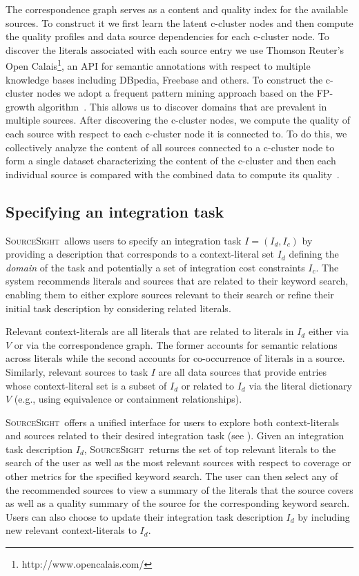 \documentclass{vldb}
\newcommand\system{\textsc{SourceSight}}
\begin{document}
The correspondence graph serves as a content and quality index for the available sources. To construct it we first learn the latent c-cluster nodes and then compute the quality profiles and data source dependencies for each c-cluster node. To discover the literals associated with each source entry we use Thomson Reuter's Open Calais\footnote{http://www.opencalais.com/}, an API for semantic annotations with respect to multiple knowledge bases including DBpedia, Freebase and others. To construct the c-cluster nodes we adopt a frequent pattern mining approach based on the FP-growth algorithm~\cite{Han:2000}. This allows us to discover domains that are prevalent in multiple sources. After discovering the c-cluster nodes, we compute the quality of each source with respect to each c-cluster node it is connected to. To do this, we collectively analyze the content of all sources connected to a c-cluster node to form a single dataset characterizing the content of the c-cluster and then each individual source is compared with the combined data to compute its quality~\cite{rekatsinas:2015}. 

\subsection{Specifying an integration task}
\label{sec:integtask}
\system~allows users to specify an integration task $I = (I_d, I_c)$ by providing a description that corresponds to a context-literal set $I_d$ defining the {\em domain} of the task and potentially a set of integration cost constraints $I_c$. The system recommends literals and sources that are related to their keyword search, enabling them to either explore sources relevant to their search or refine their initial task description by considering related literals.

Relevant context-literals are all literals that are related to literals in $I_d$ either via $V$ or via the correspondence graph. The former accounts for semantic relations across literals while the second accounts for co-occurrence of literals in a source. Similarly, relevant sources to task $I$ are all data sources that provide entries whose context-literal set is a subset of $I_d$ or related to $I_d$ via the literal dictionary $V$ (e.g., using equivalence or containment relationships). 

\system~offers a unified interface for users to explore both context-literals and sources related to their desired integration task (see ). Given an integration task description $I_d$, \system~returns the set of top relevant literals to the search of the user as well as the most relevant sources with respect to coverage or other metrics for the specified keyword search. The user can then select any of the recommended sources to view a summary of the literals that the source covers as well as a quality summary of the source for the corresponding keyword search. Users can also choose to update their integration task description $I_d$ by including new relevant context-literals to $I_d$.
\end{document}
